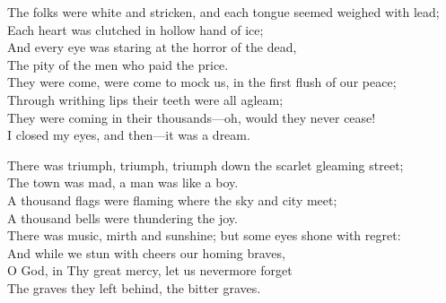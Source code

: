 \begin{poemblock}
The folks were white and stricken, and each tongue seemed weighed with lead;\\
\idt Each heart was clutched in hollow hand of ice;\\
And every eye was staring at the horror of the dead,\\
\idt The pity of the men who paid the price.\\
They were come, were come to mock us, in the first flush of our peace;\\
\idt Through writhing lips their teeth were all agleam;\\
They were coming in their thousands—oh, would they never cease!\\
\idt I closed my eyes, and then—it was a dream.

There was triumph, triumph, triumph down the scarlet gleaming street;\\
\idt The town was mad, a man was like a boy.\\
A thousand flags were flaming where the sky and city meet;\\
\idt A thousand bells were thundering the joy.\\
There was music, mirth and sunshine; but some eyes shone with regret:\\
\idt And while we stun with cheers our homing braves,\\
O God, in Thy great mercy, let us nevermore forget\\
\idt The graves they left behind, the bitter graves.

\end{poemblock}

